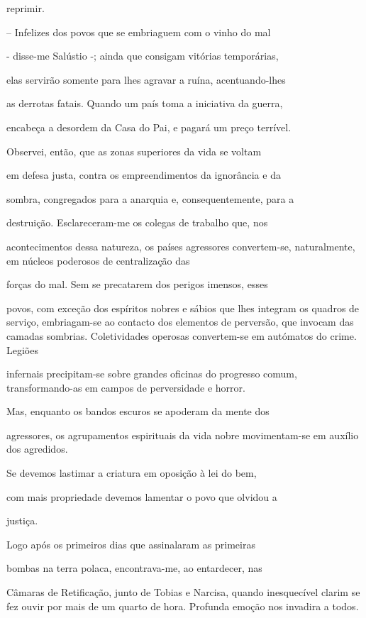 \documentclass[portuguese,12pt,a4paper]{scrbook}
\begin{document}
	reprimir.
	
	– Infelizes dos povos que se embriaguem com o vinho do mal
	
	- disse-me Salústio -; ainda que consigam vitórias temporárias,
	
	elas servirão somente para lhes agravar a ruína, acentuando-lhes
	
	as derrotas fatais. Quando um país toma a iniciativa da guerra,
	
	encabeça a desordem da Casa do Pai, e pagará um preço terrível.
	
	Observei, então, que as zonas superiores da vida se voltam
	
	em defesa justa, contra os empreendimentos da ignorância e da
	
	
	sombra, congregados para a anarquia e, consequentemente, para a
	
	destruição. Esclareceram-me os colegas de trabalho que, nos
	
	acontecimentos dessa natureza, os países agressores convertem-se, naturalmente, em núcleos poderosos de centralização das
	
	forças do mal. Sem se precatarem dos perigos imensos, esses
	
	povos, com exceção dos espíritos nobres e sábios que lhes integram os quadros de serviço, embriagam-se ao contacto dos elementos de perversão, que invocam das camadas sombrias. Coletividades operosas convertem-se em autómatos do crime. Legiões
	
	infernais precipitam-se sobre grandes oficinas do progresso comum, transformando-as em campos de perversidade e horror.
	
	Mas, enquanto os bandos escuros se apoderam da mente dos
	
	agressores, os agrupamentos espirituais da vida nobre movimentam-se em auxílio dos agredidos.
	
	Se devemos lastimar a criatura em oposição à lei do bem,
	
	com mais propriedade devemos lamentar o povo que olvidou a
	
	justiça.
	
	Logo após os primeiros dias que assinalaram as primeiras
	
	bombas na terra polaca, encontrava-me, ao entardecer, nas
	
	Câmaras de Retificação, junto de Tobias e Narcisa, quando inesquecível clarim se fez ouvir por mais de um quarto de hora. Profunda emoção nos invadira a todos.
	
\end{document}
